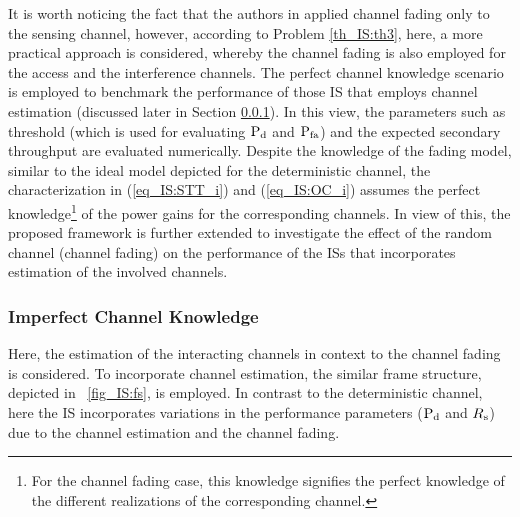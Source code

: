 \begin{remark} \label{rem_IS:rem3}
\normalfont

It is worth noticing the fact that the authors in \cite{Juarez11} applied channel fading only to the sensing channel, however, according to Problem \ref{th_IS:th3}, here, a more practical approach is considered, whereby the channel fading is also employed for the access and the interference channels. The perfect channel knowledge scenario is employed to benchmark the performance of those IS that employs channel estimation (discussed later in Section \ref{ssec_IS:ice}). In this view, the parameters such as threshold (which is used for evaluating $\text{P}_{\text{d}}$ and $\text{P}_{\text{fa}}$) and the expected secondary throughput are evaluated numerically.
Despite the knowledge of the fading model, similar to the ideal model depicted for the deterministic channel, the characterization in (\ref{eq_IS:STT_i}) and (\ref{eq_IS:OC_i}) assumes the perfect knowledge\footnote{For the channel fading case, this knowledge signifies the perfect knowledge of the different realizations of the corresponding channel.} of the power gains for the corresponding channels. In view of this, the proposed framework is further extended to investigate the effect of the random channel (channel fading) on the performance of the ISs that incorporates estimation of the involved channels.


\end{remark}

\subsubsection{Imperfect Channel Knowledge} \label{ssec_IS:ice}
Here, the estimation of the interacting channels in context to the channel fading is considered. To incorporate channel estimation, the similar frame structure, depicted in \figurename~\ref{fig_IS:fs}, is employed. In contrast to the deterministic channel, here the IS incorporates variations in the performance parameters ($\text{P}_{\text{d}}$ and $R_{\text{s}}$) due to the channel estimation and the channel fading. 

